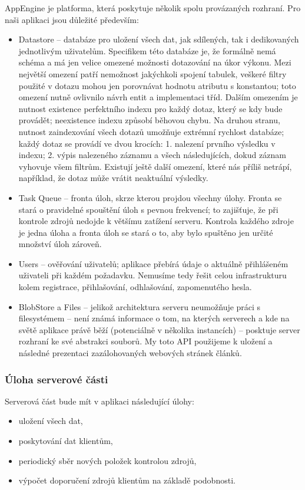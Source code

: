 AppEngine je platforma, která poskytuje několik spolu provázaných rozhraní.
Pro naši aplikaci jsou důležité především:
\begin{itemize}
	\item Datastore -- databáze pro uložení všech dat, jak sdílených, tak i dedikovaných jednotlivým uživatelům.
		Specifikem této databáze je, že formálně nemá schéma a má jen velice omezené možnosti dotazování na úkor výkonu.
		Mezi největší omezení patří nemožnost jakýchkoli spojení tabulek, veškeré filtry použité v dotazu mohou jen porovnávat hodnotu atributu s konstantou; toto omezení nutně ovlivnilo návrh entit a implementaci tříd.
		Dalším omezením je nutnost existence perfektního indexu pro každý dotaz, který se kdy bude provádět; neexistence indexu způsobí běhovou chybu.
		Na druhou stranu, nutnost zaindexování všech dotazů umožňuje extrémní rychlost databáze; každý dotaz se provádí ve dvou krocích:
		1. nalezení prvního výsledku v indexu; 2. výpis nalezeného záznamu a všech následujících, dokud záznam vyhovuje všem filtrům.
		Existují ještě další omezení, které nás příliš netrápí, například, že dotaz může vrátit neaktuální výsledky.
	\item Task Queue -- fronta úloh, skrze kterou projdou všechny úlohy.
		Fronta se stará o pravidelné spouštění úloh s pevnou frekvencí; to zajišťuje, že při kontrole zdrojů nedojde k většímu zatížení serveru.
		Kontrola každého zdroje je jedna úloha a fronta úloh se stará o to, aby bylo spuštěno jen určité množství úloh zároveň.
	\item Users -- ověřování uživatelů; aplikace přebírá údaje o aktuálně přihlášeném uživateli při každém požadavku.
		Nemusíme tedy řešit celou infrastrukturu kolem registrace, přihlašování, odhlašování, zapomenutého hesla.
	\item BlobStore a Files -- jelikož architektura serveru neumožňuje práci s filesystémem -- není známá informace o tom, na kterých serverech a kde na světě aplikace právě běží (potenciálně v několika instancích) -- posktuje server rozhraní ke své abstrakci souborů.
		My toto API použijeme k uložení a následné prezentaci zazálohovaných webových stránek článků.
\end{itemize}

\subsubsection{Úloha serverové části}

Serverová část bude mít v aplikaci následující úlohy:
\begin{itemize}
	\item uložení všech dat,
	\item poskytování dat klientům,
	\item periodický sběr nových položek kontrolou zdrojů,
	\item výpočet doporučení zdrojů klientům na základě podobnosti.
\end{itemize}

